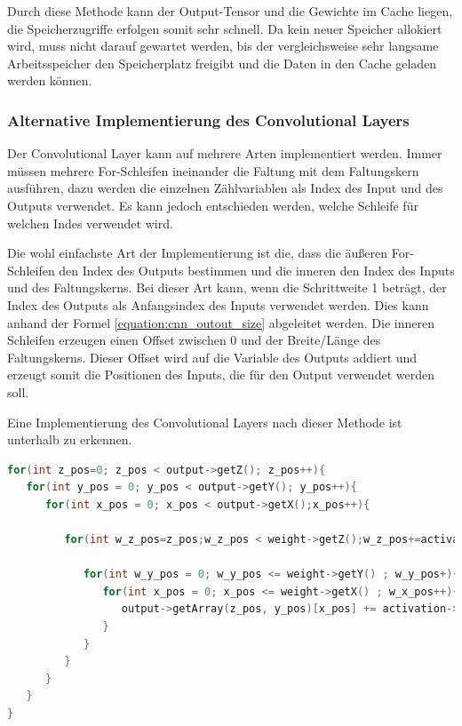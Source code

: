 \documentclass[../main.tex]{subfiles}
\begin{document}
Durch diese Methode kann der Output-Tensor und die Gewichte im Cache liegen, die Speicherzugriffe erfolgen somit sehr schnell. Da kein neuer Speicher allokiert wird, muss nicht darauf gewartet werden, bis der vergleichsweise sehr langsame Arbeitsspeicher den Speicherplatz freigibt und die Daten in den Cache geladen werden können. 

\subsubsection{Alternative Implementierung des Convolutional Layers}

Der Convolutional Layer kann auf mehrere Arten implementiert werden. Immer müssen mehrere For-Schleifen ineinander die Faltung mit dem Faltungskern ausführen, dazu werden die einzelnen Zählvariablen als Index des Input und des Outputs verwendet. Es kann jedoch entschieden werden, welche Schleife für welchen Indes verwendet wird.

Die wohl einfachste Art der Implementierung ist die, dass die äußeren For-Schleifen den Index des Outputs bestimmen und die inneren den Index des Inputs und des Faltungskerns. Bei dieser Art kann, wenn die Schrittweite 1 beträgt, der Index des Outputs als Anfangsindex des Inputs verwendet werden. Dies kann anhand der Formel \ref{equation:cnn_outout_size} abgeleitet werden. Die inneren Schleifen erzeugen einen Offset zwischen 0 und der Breite/Länge des Faltungskerns. Dieser Offset wird auf die Variable des Outputs addiert und erzeugt somit die Positionen des Inputs, die für den Output verwendet werden soll.

Eine Implementierung des Convolutional Layers nach dieser Methode ist unterhalb zu erkennen.
\begin{lstlisting}[language=c++, caption=Convolution: Output durchgehen, captionpos=b, label=listing:conv_output, frame=single, linewidth=\textwidth, breaklines=true]
for(int z_pos=0; z_pos < output->getZ(); z_pos++){
   for(int y_pos = 0; y_pos < output->getY(); y_pos++){
      for(int x_pos = 0; x_pos < output->getX();x_pos++){
      
         for(int w_z_pos=z_pos;w_z_pos < weight->getZ();w_z_pos+=activation->getZ()){
         
            for(int w_y_pos = 0; w_y_pos <= weight->getY() ; w_y_pos+){
               for(int x_pos = 0; x_pos <= weight->getX() ; w_x_pos++){
                  output->getArray(z_pos, y_pos)[x_pos] += activation->getArray(z_pos,y_pos+w_y_pos)[x_pos+w_x_pos] * weight->getArray(w_z_pos,w_y_rec)[w_x_rec];
               }
            }
         }
      }
   }
}
\end{lstlisting}
\end{document}
